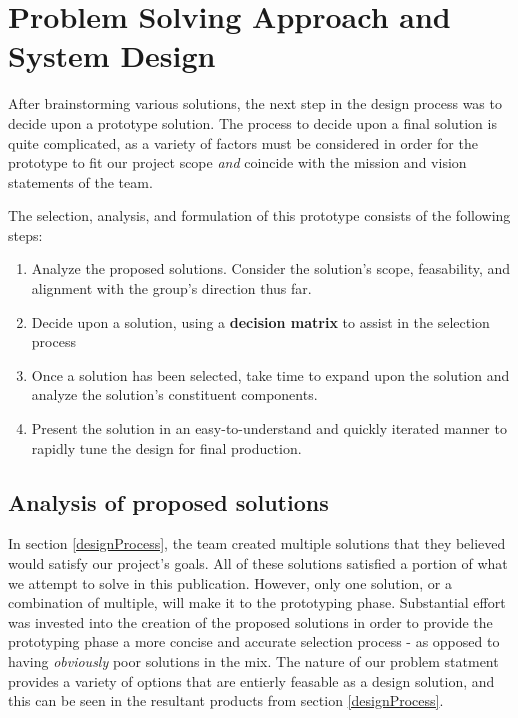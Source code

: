 \documentclass[../main.tex]{subfiles}
\begin{document}
\section{Problem Solving Approach and System Design}\label{prototypes}
After brainstorming various solutions, the next step in the design process was to decide upon a prototype solution. The process to decide upon a final solution is quite complicated, as a variety of factors must be considered in order for the prototype to fit our project scope \emph{and} coincide with the mission and vision statements of the team.\par
The selection, analysis, and formulation of this prototype consists of the following steps:\par
\begin{singlespace}
\begin{enumerate}
    \item Analyze the proposed solutions. Consider the solution's scope, feasability, and alignment with the group's direction thus far.
    \item Decide upon a solution, using a \textbf{decision matrix} to assist in the selection process
    \item Once a solution has been selected, take time to expand upon the solution and analyze the solution's constituent components.
    \item Present the solution in an easy-to-understand and quickly iterated manner to rapidly tune the design for final production.
\end{enumerate}
\end{singlespace}

\newpage
\subsection{Analysis of proposed solutions}
In section \ref{designProcess}, the team created multiple solutions that they believed would satisfy our project's goals. All of these solutions satisfied a portion of what we attempt to solve in this publication. However, only one solution, or a combination of multiple, will make it to the prototyping phase. Substantial effort was invested into the creation of the proposed solutions in order to provide the prototyping phase a more concise and accurate selection process - as opposed to having \emph{obviously} poor solutions in the mix. The nature of our problem statment provides a variety of options that are entierly feasable as a design solution, and this can be seen in the resultant products from section \ref{designProcess}.\par
\end{document}
